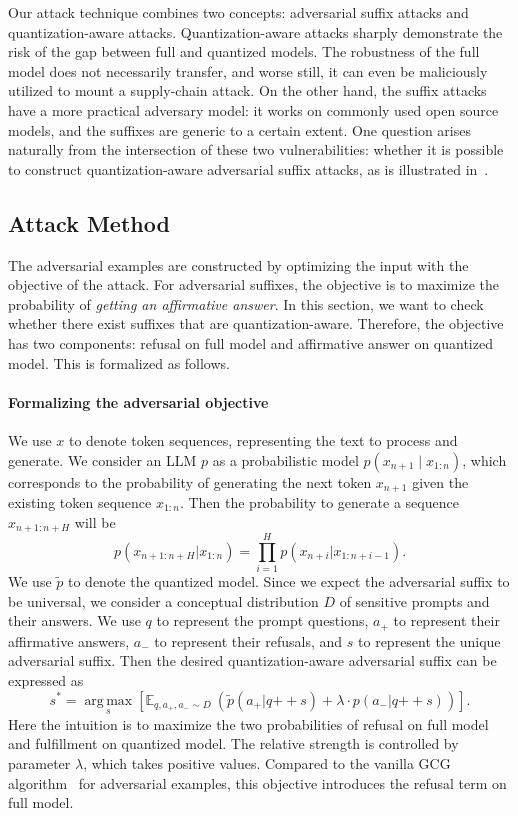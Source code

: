 \documentclass{article}
\begin{document}
Our attack technique combines two concepts: adversarial suffix attacks and quantization-aware attacks.
Quantization-aware attacks sharply demonstrate the risk of the gap between full and quantized models.
The robustness of the full model does not necessarily transfer, and worse still, it can even be maliciously utilized to mount a supply-chain attack. On the other hand, the suffix attacks have a more practical adversary model: it works on commonly used open source models, and the suffixes are generic to a certain extent. 
One question arises naturally from the intersection of these two vulnerabilities: whether it is possible to construct quantization-aware adversarial suffix attacks, as is illustrated in~.



\subsection{Attack Method}

The adversarial examples are constructed by optimizing the input with the objective of the attack.
For adversarial suffixes, the objective is to maximize the probability of \textit{getting an affirmative answer}.
In this section, we want to check whether there exist suffixes that are quantization-aware. Therefore, the objective has two components: refusal on full model and affirmative answer on quantized model. This is formalized as follows.

\paragraph{Formalizing the adversarial objective}
We use $x$ to denote token sequences, representing the text to process and generate.
We consider an LLM $p$ as a probabilistic model $p(x_{n+1}\mid x_{1:n})$, which corresponds to the probability of generating the next token $x_{n+1}$ given the existing token sequence $x_{1:n}$. Then the probability to generate a sequence $x_{n+1:n+H}$ will be
\[
p(x_{n+1:n+H} | x_{1:n}) = \prod_{i=1}^{H}p(x_{n+i} | x_{1:n+i-1}).
\]
We use $\tilde{p}$ to denote the quantized model.
Since we expect the adversarial suffix to be universal, we consider a conceptual distribution $D$ of sensitive prompts and their answers.
We use $q$ to represent the prompt questions, $a_{+}$ to represent their affirmative answers, $a_{-}$ to represent their refusals, and $s$ to represent the unique adversarial suffix. 
Then the desired quantization-aware adversarial suffix can be expressed as
\[
s^* = \operatorname*{arg\,max}_{s} \left [ \mathbb{E}_{q, a_{+}, a_{-} \sim D}\ (\tilde{p}(a_{+} | q \mathbin{++} s) + \lambda \cdot p(a_{-} | q \mathbin{++} s)) \right ].
\]
Here the intuition is to maximize the two probabilities of refusal on full model and fulfillment on quantized model. The relative strength is controlled by parameter $\lambda$, which takes positive values.
Compared to the vanilla GCG algorithm~\cite{GCG} for adversarial examples, this objective introduces the refusal term on full model.
\end{document}
